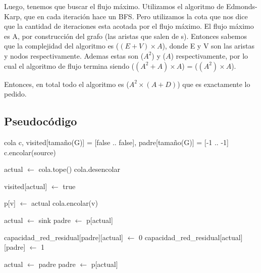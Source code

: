 \par{Luego, tenemos que buscar el flujo máximo. Utilizamos el algoritmo de Edmonds-Karp, que en cada iteración hace un BFS.
Pero utilizamos la cota que nos dice que la cantidad de iteraciones esta acotada por el flujo máximo. 
El flujo máximo es A, por construcción del grafo (las aristas que salen de s).
Entonces sabemos que la complejidad del algoritmo es \bigo($ (E + V) \times A$), donde E y V son las aristas y nodos respectivamente.
Ademas estas son \bigo($A^2$) y \bigo($A$) respectivamente, por lo cual el algoritmo de flujo termina siendo \bigo($ (A^2 + A) \times A$) 
= \bigo($ (A^2) \times A$). }

\par{Entonces, en total todo el algoritmo es \bigo($ A^2 \times (A + D) $) que es exactamente lo pedido.}


\subsection{Pseudocódigo}
	
\begin{algorithmic}
	\State cola c, visited[tamaño(G)] = [false .. false], padre[tamaño(G)] = [-1 .. -1]
	\State c.encolar(source)
	

		\State actual $\leftarrow$ cola.tope()
		\State cola.desencolar
		
		\State visited[actual] $\leftarrow$ true
	
		 
					\State p[v] $\leftarrow$ actual
					\State cola.encolar(v)
				\EndIf
		\EndFor 
	\EndWhile

		\State {} 
	\EndIf

	\State actual $\leftarrow$ sink
	\State padre $\leftarrow$ p[actual]
	
		\State capacidad_red_residual[padre][actual] $\leftarrow$ 0
		\State capacidad_red_residual[actual][padre] $\leftarrow$ 1
		
		\State actual $\leftarrow$ padre
		\State padre $\leftarrow$ p[actual]
	\EndWhile

	\State {} 
\EndFunction
\end{algorithmic}
\hspace{1cm}

